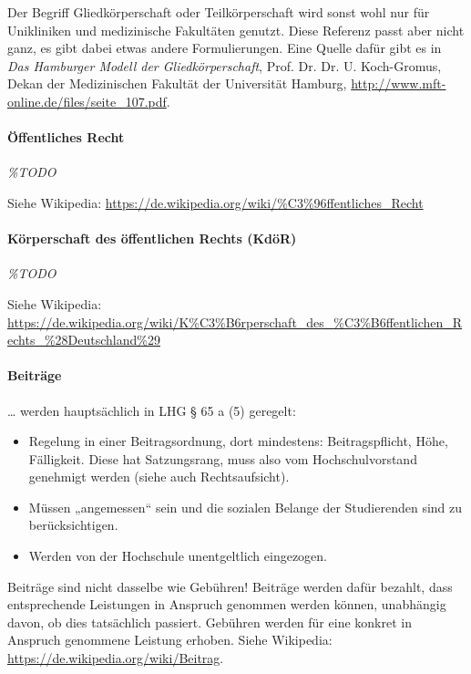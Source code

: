 \documentclass[
10pt,
a4paper,
twoside,								%
titlepage=false,							%
draft=false								%
]{scrartcl}
\begin{document}
Der Begriff Gliedkörperschaft oder Teilkörperschaft wird sonst wohl nur für Unikliniken und medizinische Fakultäten genutzt. Diese Referenz passt aber nicht ganz, es gibt dabei etwas andere Formulierungen. Eine Quelle dafür gibt es in \emph{Das Hamburger Modell der Gliedkörperschaft}, Prof. Dr. Dr. U. Koch-Gromus, Dekan der Medizinischen Fakultät der Universität Hamburg, \url{http://www.mft-online.de/files/seite_107.pdf}.



\paragraph{Öffentliches Recht}

\textit{\%TODO}

Siehe Wikipedia: \url{https://de.wikipedia.org/wiki/%C3%96ffentliches_Recht}



\paragraph{Körperschaft des öffentlichen Rechts (KdöR)}

\textit{\%TODO}

Siehe Wikipedia: \sloppy \url{https://de.wikipedia.org/wiki/K%C3%B6rperschaft_des_%C3%B6ffentlichen_Rechts_%28Deutschland%29}



\paragraph{Beiträge}

… werden hauptsächlich in LHG § 65 a (5) geregelt:
\begin{itemize}
	\item Regelung in einer Beitragsordnung, dort mindestens: Beitragspflicht, Höhe, Fälligkeit. Diese hat Satzungsrang, muss also vom Hochschulvorstand genehmigt werden (siehe auch Rechtsaufsicht).
	\item Müssen „angemessen“ sein und die sozialen Belange der Studierenden sind zu berücksichtigen.
	\item Werden von der Hochschule unentgeltlich eingezogen.
\end{itemize}
Beiträge sind nicht dasselbe wie Gebühren! Beiträge werden dafür bezahlt, dass entsprechende Leistungen in Anspruch genommen werden können, unabhängig davon, ob dies tatsächlich passiert. Gebühren werden für eine konkret in Anspruch genommene Leistung erhoben. Siehe Wikipedia: \url{https://de.wikipedia.org/wiki/Beitrag}.
\end{document}

